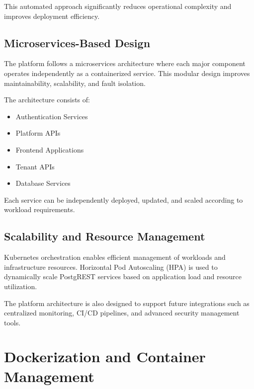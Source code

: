 \documentclass[12pt,a4paper]{report}
\begin{document}
This automated approach significantly reduces operational complexity and improves deployment efficiency.

\section{Microservices-Based Design}

The platform follows a microservices architecture where each major component operates independently as a containerized service. This modular design improves maintainability, scalability, and fault isolation.

The architecture consists of:

\begin{itemize}

    \item Authentication Services
    \item Platform APIs
    \item Frontend Applications
    \item Tenant APIs
    \item Database Services

\end{itemize}

Each service can be independently deployed, updated, and scaled according to workload requirements.

\section{Scalability and Resource Management}

Kubernetes orchestration enables efficient management of workloads and infrastructure resources. Horizontal Pod Autoscaling (HPA) is used to dynamically scale PostgREST services based on application load and resource utilization.

The platform architecture is also designed to support future integrations such as centralized monitoring, CI/CD pipelines, and advanced security management tools.














\newpage

\chapter{Dockerization and Container Management}
\end{document}
